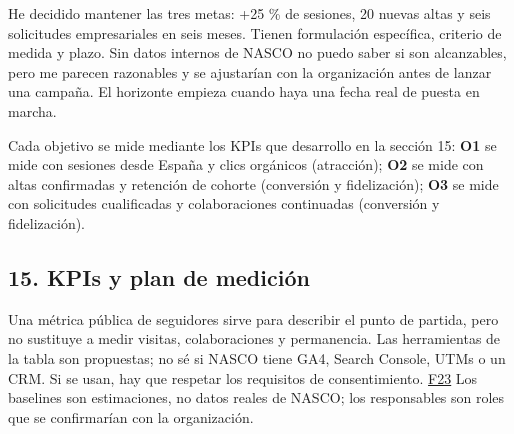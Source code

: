 \documentclass[
]{article}
\begin{document}
He decidido mantener las tres metas: +25 \% de sesiones, 20 nuevas altas
y seis solicitudes empresariales en seis meses. Tienen formulación
específica, criterio de medida y plazo. Sin datos internos de NASCO no
puedo saber si son alcanzables, pero me parecen razonables y se
ajustarían con la organización antes de lanzar una campaña. El horizonte
empieza cuando haya una fecha real de puesta en marcha.

Cada objetivo se mide mediante los KPIs que desarrollo en la sección 15:
\textbf{O1} se mide con sesiones desde España y clics orgánicos
(atracción); \textbf{O2} se mide con altas confirmadas y retención de
cohorte (conversión y fidelización); \textbf{O3} se mide con solicitudes
cualificadas y colaboraciones continuadas (conversión y fidelización).

\hypertarget{kpis-y-plan-de-mediciuxf3n}{%
\subsection{15. KPIs y plan de
medición}\label{kpis-y-plan-de-mediciuxf3n}}

Una métrica pública de seguidores sirve para describir el punto de
partida, pero no sustituye a medir visitas, colaboraciones y
permanencia. Las herramientas de la tabla son propuestas; no sé si NASCO
tiene GA4, Search Console, UTMs o un CRM. Si se usan, hay que respetar
los requisitos de consentimiento.
\href{https://www.aepd.es/prensa-y-comunicacion/notas-de-prensa/aepd-actualiza-guia-cookies-para-adaptarla-a-nuevas-directrices-cepd}{F23}
Los baselines son estimaciones, no datos reales de NASCO; los
responsables son roles que se confirmarían con la organización.
\end{document}
